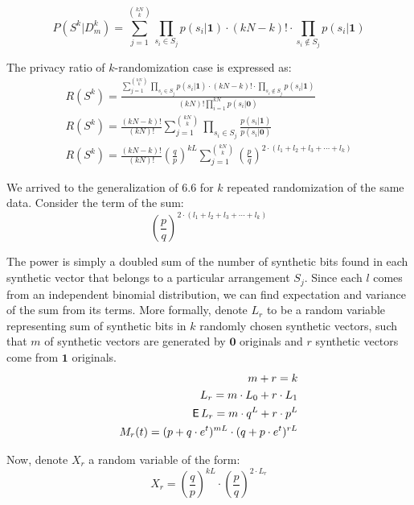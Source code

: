 \documentclass[11pt]{article}
\newcommand{\zv}{\textbf{0}}
\newcommand{\uv}{\textbf{1}}
\begin{document}
\[ P(S^k|D^k_m) = \sum_{j=1}^{\binom{kN}{k}}  \prod_{s_i \in S_j} p(s_i| \uv ) \cdot (kN -k)! \cdot \prod_{s_i \notin S_j} p(s_i| \uv ) \]

The privacy ratio of $k$-randomization case is expressed as:
\begin{align}
R(S^k) = \frac {\sum_{j=1}^{\binom{kN}{k}}  \prod_{s_i \in S_j} p(s_i| \uv ) \cdot (kN -k)! \cdot \prod_{s_i \notin S_j} p(s_i| \uv ) } { (kN)! \prod_{i=1}^{kN} p(s_i| \zv)  }  \\
R(S^k) = \frac{ (kN-k)! }{(kN)!}   \sum_{j=1}^{\binom{kN}{k}}  \prod_{s_i \in S_j} \frac{ p(s_i| \uv ) }{ p(s_i|\zv)}  \\
R(S^k) = \frac{ (kN-k)! }{(kN)!}   \left ( \frac{q}{p} \right )^{kL} \sum_{j=1}^{\binom{kN}{k}}   \left ( \frac{p}{q} \right )^{2 \cdot (l_1 + l_2  + l_3 + \cdots + l_k)}
\end{align}

We arrived to the generalization of $6.6$ for $k$ repeated randomization of the same data.  Consider the term of the sum:
\[  \left ( \frac{p}{q} \right )^{2 \cdot (l_1 + l_2  + l_3 + \cdots + l_k)}  \]

The power is simply a doubled sum of the number of synthetic bits found in each synthetic vector that belongs to a particular arrangement $S_j$.   Since each $l$ comes from an independent binomial distribution, we can find expectation and variance of the sum from its terms.  More formally, denote $L_r$ to be a random variable representing sum of synthetic bits in $k$ randomly chosen synthetic vectors, such that $m$  of synthetic vectors are generated by $\zv$ originals and $r$ synthetic vectors come from $\uv$ originals.
\begin{align}
m + r = k \\
L_r = m \cdot L_0 + r \cdot L_1 \\
\operatorname{\mathsf{E}} L_r =  m \cdot q^L + r \cdot p^L \\
M_r(t) = (p + q \cdot e^t)^{mL}\cdot (q + p\cdot e^t)^{rL}
\end{align}

Now, denote $X_r$ a random variable of the form:
\[  X_r =   \left ( \frac{q}{p} \right )^{kL}  \cdot \left ( \frac{p}{q} \right )^{2 \cdot L_r}  \]
\end{document}
